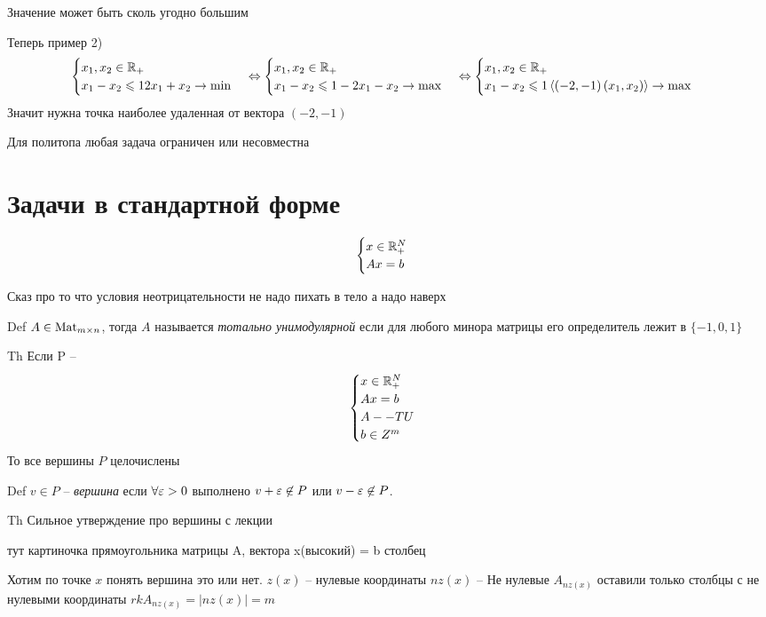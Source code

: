 Значение может быть сколь угодно большим

Теперь пример 2)
\[
	\begin{cases}
		x_1, x_2 \in \mathbb{R}_+\\
		x_1 - x_2 \leqslant 1
		2 x_1 + x_2 \to \min
	\end{cases}	
	\Leftrightarrow
	\begin{cases}
		x_1, x_2 \in \mathbb{R}_+\\
		x_1 - x_2 \leqslant 1
		-2 x_1 - x_2 \to \max
	\end{cases}	
	\Leftrightarrow
	\begin{cases}
		x_1, x_2 \in \mathbb{R}_+\\
		x_1 - x_2 \leqslant 1
		\left< \left(-2, -1\right) \left(x_1, x_2\right) \right> \to \max
	\end{cases}
\]
Значит нужна точка наиболее удаленная от вектора $\left(-2, -1\right)$

Для политопа любая задача ограничен или несовместна

\section*{Задачи в стандартной форме}
\[
	\begin{cases}
		x \in \mathbb{R}_+^N\\
		A x = b\\
	\end{cases}
\]

Сказ про то что условия неотрицательности не надо пихать в тело а надо наверх

Def $A \in \mathrm{Mat}_{m \times n}$, тогда $A$ называется \emph{тотально унимодулярной} 
если для любого минора матрицы его определитель лежит в $\{-1, 0, 1\}$

Th Если P -- 
\[
	\begin{cases}
		x \in \mathbb{R}_+^N\\
		A x = b\\
		A -- TU\\
		b \in Z^m
	\end{cases}
\]
То все вершины $P$ целочислены

Def $v \in P$ -- \emph{вершина} если $\forall \varepsilon > 0$ выполнено $v + \varepsilon \not \in P$ или $v - \varepsilon \not \in P$.

Th Сильное утверждение про вершины с лекции

тут картиночка прямоугольника матрицы A, вектора x(высокий) = b столбец

Хотим по точке $x$ понять вершина это или нет.
$z(x)$ -- нулевые координаты
$nz(x)$ --  Не нулевые
$A_{nz(x)}$ оставили только столбцы с не нулевыми координаты
$rk A_{nz(x)} = |nz(x)| = m$

